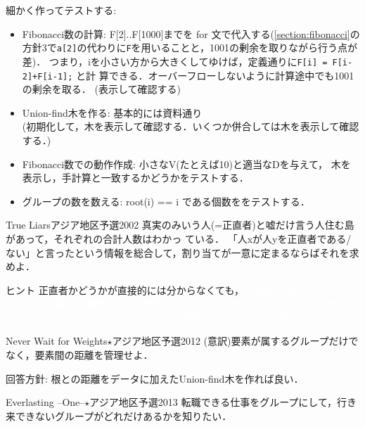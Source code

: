 細かく作ってテストする:
\begin{itemize}
\setlength{\itemsep}{0pt}
\item Fibonacci数の計算: F[2]..F[1000]までを for 文で代入する(\ref{section:fibonacci}の方針3で\texttt{a[2]}の代わりに\texttt{F}を用いることと，1001の剰余を取りながら行う点が差)．
つまり，iを小さい方から大きくしてゆけば，定義通りに\texttt{F[i] = F[i-2]+F[i-1];} と計
算できる．オーバーフローしないように計算途中でも1001の剰余を取る．
(表示して確認する)
\item Union-find木を作る: 基本的には資料通り\\
(初期化して，木を表示して確認する．いくつか併合しては木を表示して確認する．)
\item Fibonacci数での動作作成: 小さなV(たとえば10)と適当なDを与えて，
  木を表示し，手計算と一致するかどうかをテストする．
\item グループの数を数える: root(i) == i である個数ををテストする．
\end{itemize}


\begin{pbox}{True Liars}{アジア地区予選2002}
真実のみいう人(=正直者)と嘘だけ言う人住む島があって，それぞれの合計人数はわかっ
ている．
「人xが人yを正直者である/ない」と言ったという情報を総合して，割り当てが一意に定まるならばそれを求めよ．

\end{pbox}

\begin{tipsbox}{ヒント}
正直者かどうかが直接的には分からなくても，\textcolor{white}{正直者か嘘つきかどちらかに共通に属する複数の人物の情報が分かる場合がある．そのような人を集めてグループ化する．各グループについて正直者かそうでないかを割り当ててみる．}
\end{tipsbox}

\begin{pbox}{Never Wait for Weights$\star$}{アジア地区予選2012}
(意訳)要素が属するグループだけでなく，要素間の距離を管理せよ．

\end{pbox}

回答方針: 根との距離をデータに加えたUnion-find木を作れば良い．

\begin{pbox}{Everlasting --One--$\star$}{アジア地区予選2013}
転職できる仕事をグループにして，行き来できないグループがどれだけあるかを知りたい．

\end{pbox}



